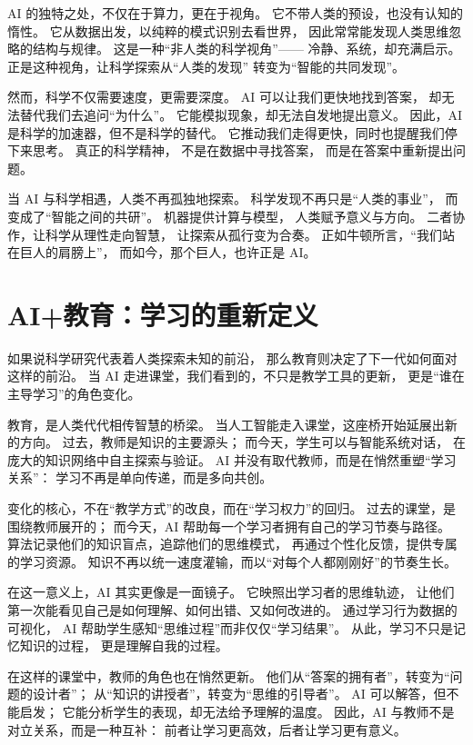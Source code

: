 AI 的独特之处，不仅在于算力，更在于视角。  
它不带人类的预设，也没有认知的惰性。  
它从数据出发，以纯粹的模式识别去看世界，  
因此常常能发现人类思维忽略的结构与规律。  
这是一种“非人类的科学视角”——  
冷静、系统，却充满启示。  
正是这种视角，让科学探索从“人类的发现”  
转变为“智能的共同发现”。

然而，科学不仅需要速度，更需要深度。  
AI 可以让我们更快地找到答案，  
却无法替代我们去追问“为什么”。  
它能模拟现象，却无法自发地提出意义。  
因此，AI 是科学的加速器，但不是科学的替代。  
它推动我们走得更快，同时也提醒我们停下来思考。  
真正的科学精神，  
不是在数据中寻找答案，  
而是在答案中重新提出问题。

当 AI 与科学相遇，人类不再孤独地探索。  
科学发现不再只是“人类的事业”，  
而变成了“智能之间的共研”。  
机器提供计算与模型，  
人类赋予意义与方向。  
二者协作，让科学从理性走向智慧，  
让探索从孤行变为合奏。  
正如牛顿所言，“我们站在巨人的肩膀上”，  
而如今，那个巨人，也许正是 AI。

\section{AI+教育：学习的重新定义}

如果说科学研究代表着人类探索未知的前沿，  
那么教育则决定了下一代如何面对这样的前沿。  
当 AI 走进课堂，我们看到的，不只是教学工具的更新，  
更是“谁在主导学习”的角色变化。

教育，是人类代代相传智慧的桥梁。  
当人工智能走入课堂，这座桥开始延展出新的方向。  
过去，教师是知识的主要源头；  
而今天，学生可以与智能系统对话，  
在庞大的知识网络中自主探索与验证。  
AI 并没有取代教师，而是在悄然重塑“学习关系”：  
学习不再是单向传递，而是多向共创。

变化的核心，不在“教学方式”的改良，而在“学习权力”的回归。  
过去的课堂，是围绕教师展开的；  
而今天，AI 帮助每一个学习者拥有自己的学习节奏与路径。  
算法记录他们的知识盲点，追踪他们的思维模式，  
再通过个性化反馈，提供专属的学习资源。  
知识不再以统一速度灌输，而以“对每个人都刚刚好”的节奏生长。

在这一意义上，AI 其实更像是一面镜子。  
它映照出学习者的思维轨迹，  
让他们第一次能看见自己是如何理解、如何出错、又如何改进的。  
通过学习行为数据的可视化，  
AI 帮助学生感知“思维过程”而非仅仅“学习结果”。  
从此，学习不只是记忆知识的过程，  
更是理解自我的过程。

在这样的课堂中，教师的角色也在悄然更新。  
他们从“答案的拥有者”，转变为“问题的设计者”；  
从“知识的讲授者”，转变为“思维的引导者”。  
AI 可以解答，但不能启发；  
它能分析学生的表现，却无法给予理解的温度。  
因此，AI 与教师不是对立关系，而是一种互补：  
前者让学习更高效，后者让学习更有意义。

